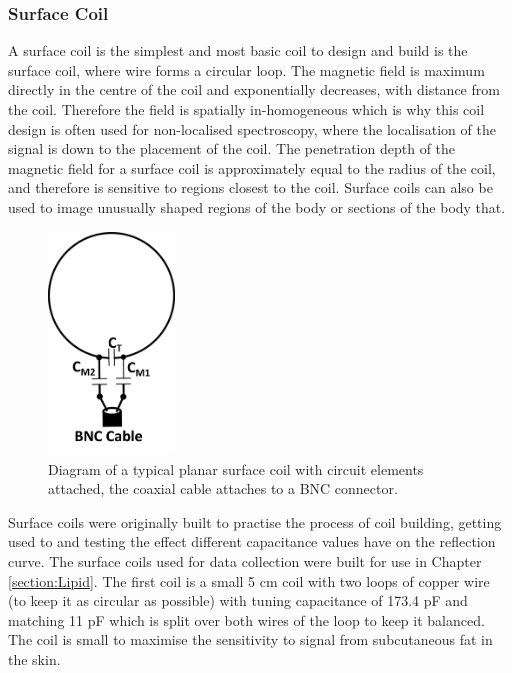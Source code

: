\documentclass[class=article, crop=false]{standalone}
\begin{document}
\subsubsection{Surface Coil}

A surface coil is the simplest and most basic coil to design and build is the surface coil, where wire forms a circular loop. The magnetic field is maximum directly in the centre of the coil and exponentially decreases, with distance from the coil. Therefore the field is spatially in-homogeneous which is why this coil design is often used for non-localised spectroscopy, where the localisation of the signal is down to the placement of the coil. The penetration depth of the magnetic field for a surface coil is approximately equal to the radius of the coil, and therefore is sensitive to regions closest to the coil. Surface coils can also be used to image unusually shaped regions of the body or sections of the body that.

\begin{figure}
    \centering
    \includegraphics[width=0.3\textwidth]{Figures/Theory/Surface_Coil.png}
    \caption{Diagram of a typical planar surface coil with circuit elements attached, the coaxial cable attaches to a BNC connector.}
    \label{fig:theory:Surface}
\end{figure}

Surface coils were originally built to practise the process of coil building, getting used to and testing the effect different capacitance values have on the reflection curve. The surface coils used for data collection were built for use in Chapter \ref{section:Lipid}. The first coil is a small 5 cm coil with two loops of copper wire (to keep it as circular as possible) with tuning capacitance of 173.4 pF and matching 11 pF which is split over both wires of the loop to keep it balanced. The coil is small to maximise the sensitivity to signal from subcutaneous fat in the skin.
\end{document}
